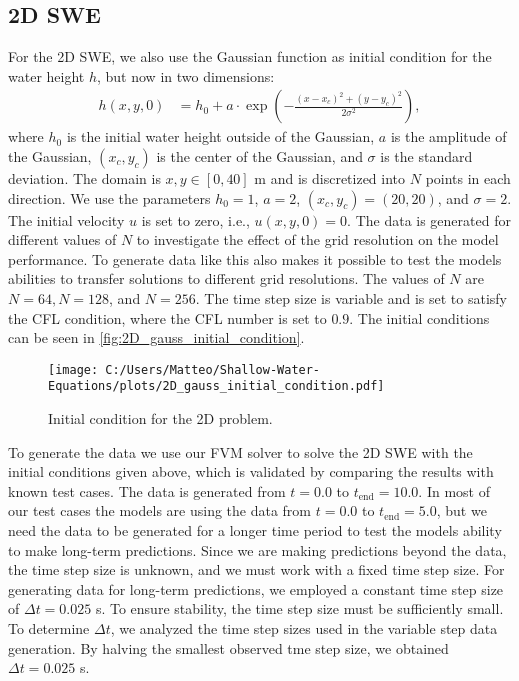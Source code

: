 \subsection*{2D SWE}
For the 2D SWE, we also use the Gaussian function as initial condition for the water height $h$, but now in two dimensions:
\begin{align*}
    h(x,y,0) &= h_0 + a \cdot \exp \left( -\frac{{(x-x_c)}^2 + {(y-y_c)}^2}{2\sigma^2} \right), 
\end{align*}
where $h_0$ is the initial water height outside of the Gaussian, $a$ is the amplitude of the Gaussian, $(x_c, y_c)$ is the center of the Gaussian, and $\sigma$ is the standard deviation.
The domain is $x,y \in [0,40]$ m and is discretized into $N$ points in each direction.
We use the parameters $h_0 = 1$, $a = 2$, $(x_c, y_c) = (20, 20)$, and $\sigma = 2$.
The initial velocity $u$ is set to zero, i.e., $u(x,y,0) = 0$.
The data is generated for different values of $N$ to investigate the effect of the grid resolution on the model performance.
To generate data like this also makes it possible to test the models abilities to transfer solutions to different grid resolutions.
The values of $N$ are $N = 64, N = 128$, and $N = 256$.
The time step size is variable and is set to satisfy the CFL condition, where the CFL number is set to $0.9$.
The initial conditions can be seen in \autoref{fig:2D_gauss_initial_condition}.
\begin{figure}[H]
    \centering
    \texttt{[image: C:/Users/Matteo/Shallow-Water-Equations/plots/2D\_gauss\_initial\_condition.pdf]}
    \caption{Initial condition for the 2D problem.}\label{fig:2D_gauss_initial_condition}
\end{figure}
To generate the data we use our FVM solver to solve the 2D SWE with the initial conditions given above, which is validated by comparing the results with known test cases.
The data is generated from $t = 0.0$ to $t_{\text{end}} = 10.0$.
In most of our test cases the models are using the data from $t = 0.0$ to $t_{\text{end}} = 5.0$, but we need the data to be generated for a longer time period to test the models ability to make long-term predictions.
Since we are making predictions beyond the data, the time step size is unknown, and we must work with a fixed time step size.
For generating data for long-term predictions, we employed a constant time step size of $\Delta t = 0.025$ s.
To ensure stability, the time step size must be sufficiently small.
To determine $\Delta t$, we analyzed the time step sizes used in the variable step data generation. 
By halving the smallest observed tme step size, we obtained $\Delta t = 0.025$ s.


